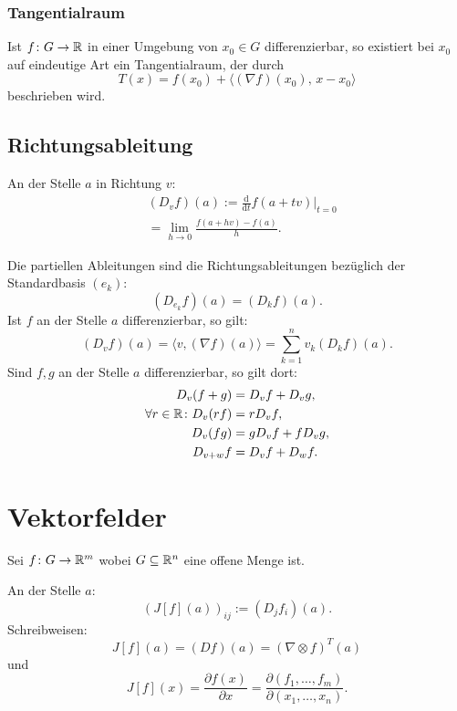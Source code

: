 \subsubsection{Tangentialraum}
Ist $f\colon G\to\mathbb R$ in einer Umgebung von $x_0\in G$
differenzierbar, so existiert bei $x_0$ auf eindeutige Art
ein Tangentialraum, der durch
\begin{equation}
T(x) = f(x_0)+\langle(\nabla f)(x_0),\,x-x_0\rangle
\end{equation}
beschrieben wird.

\subsection{Richtungsableitung}
\begin{definition}[Richtungsableitung]
An der Stelle $a$ in Richtung $v$:
\begin{equation}
\begin{split}
& (D_v f)(a) := \frac{\mathrm d}{\mathrm dt} f(a+tv)\Big|_{t=0}\\
& = \lim_{h\to 0} \frac{f(a+hv)-f(a)}{h}.
\end{split}
\end{equation}
\end{definition}
\noindent
Die partiellen Ableitungen sind die Richtungsableitungen
bezüglich der Standardbasis $(e_k)$:
\begin{equation}
(D_{\displaystyle e_k}f)(a) = (D_k f)(a).
\end{equation}
Ist $f$ an der Stelle $a$ differenzierbar, so gilt:
\begin{equation}
(D_v f)(a) = \langle v,(\nabla f)(a)\rangle
= \sum_{k=1}^n v_k (D_k f)(a).
\end{equation}
Sind $f,g$ an der Stelle $a$ differenzierbar, so gilt dort:
\begin{align}
D_v (f+g) &= D_v f+D_v g,\\
\forall r\in\mathbb R\colon D_v (rf) &= rD_v f,\\
D_v (fg) &= gD_v f+fD_v g,\\
D_{v+w} f &= D_v f+D_w f.
\end{align}

\section{Vektorfelder}
Sei $f\colon G\to\mathbb R^m$ wobei $G\subseteq\mathbb R^n$ eine offene Menge ist.
\begin{definition}
An der Stelle $a$:
\begin{equation}
(J[f](a))_{ij} := (D_j f_i)(a).
\end{equation}
Schreibweisen:
\begin{equation}
J[f](a) = (Df)(a) = (\nabla\otimes f)^T(a)
\end{equation}
und
\begin{equation}
J[f](x) = \frac{\partial f(x)}{\partial x}
= \frac{\partial(f_1,\ldots,f_m)}{\partial(x_1,\ldots,x_n)}.
\end{equation}
\end{definition}

